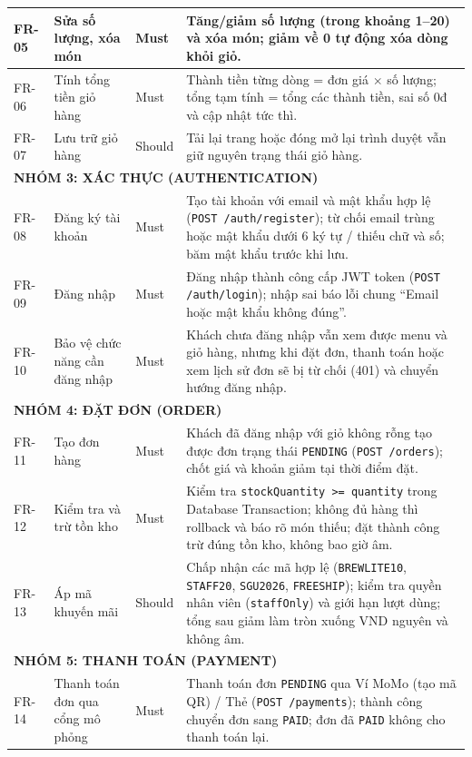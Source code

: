 \begin{longtable}{|p{}|p{}|p{}|p{}|}
\hline
FR-05 & Sửa số lượng, xóa món & Must & Tăng/giảm số lượng (trong khoảng 1--20) và xóa món; giảm về 0 tự động xóa dòng khỏi giỏ. \\
\hline
FR-06 & Tính tổng tiền giỏ hàng & Must & Thành tiền từng dòng = đơn giá $\times$ số lượng; tổng tạm tính = tổng các thành tiền, sai số 0đ và cập nhật tức thì. \\
\hline
FR-07 & Lưu trữ giỏ hàng & Should & Tải lại trang hoặc đóng mở lại trình duyệt vẫn giữ nguyên trạng thái giỏ hàng. \\
\hline
\multicolumn{4}{|l|}{\textbf{NHÓM 3: XÁC THỰC (AUTHENTICATION)}} \\
\hline
FR-08 & Đăng ký tài khoản & Must & Tạo tài khoản với email và mật khẩu hợp lệ (\texttt{POST /auth/register}); từ chối email trùng hoặc mật khẩu dưới 6 ký tự / thiếu chữ và số; băm mật khẩu trước khi lưu. \\
\hline
FR-09 & Đăng nhập & Must & Đăng nhập thành công cấp JWT token (\texttt{POST /auth/login}); nhập sai báo lỗi chung ``Email hoặc mật khẩu không đúng''. \\
\hline
FR-10 & Bảo vệ chức năng cần đăng nhập & Must & Khách chưa đăng nhập vẫn xem được menu và giỏ hàng, nhưng khi đặt đơn, thanh toán hoặc xem lịch sử đơn sẽ bị từ chối (401) và chuyển hướng đăng nhập. \\
\hline
\multicolumn{4}{|l|}{\textbf{NHÓM 4: ĐẶT ĐƠN (ORDER)}} \\
\hline
FR-11 & Tạo đơn hàng & Must & Khách đã đăng nhập với giỏ không rỗng tạo được đơn trạng thái \texttt{PENDING} (\texttt{POST /orders}); chốt giá và khoản giảm tại thời điểm đặt. \\
\hline
FR-12 & Kiểm tra và trừ tồn kho & Must & Kiểm tra \texttt{stockQuantity >= quantity} trong Database Transaction; không đủ hàng thì rollback và báo rõ món thiếu; đặt thành công trừ đúng tồn kho, không bao giờ âm. \\
\hline
FR-13 & Áp mã khuyến mãi & Should & Chấp nhận các mã hợp lệ (\texttt{BREWLITE10}, \texttt{STAFF20}, \texttt{SGU2026}, \texttt{FREESHIP}); kiểm tra quyền nhân viên (\texttt{staffOnly}) và giới hạn lượt dùng; tổng sau giảm làm tròn xuống VND nguyên và không âm. \\
\hline
\multicolumn{4}{|l|}{\textbf{NHÓM 5: THANH TOÁN (PAYMENT)}} \\
\hline
FR-14 & Thanh toán đơn qua cổng mô phỏng & Must & Thanh toán đơn \texttt{PENDING} qua Ví MoMo (tạo mã QR) / Thẻ (\texttt{POST /payments}); thành công chuyển đơn sang \texttt{PAID}; đơn đã \texttt{PAID} không cho thanh toán lại. \\

\end{longtable}
